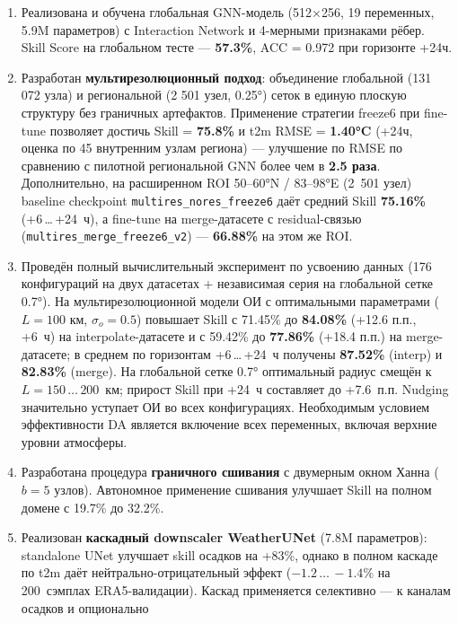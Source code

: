 \documentclass[14pt,a4paper]{extarticle}
\numberwithin{table}{section}
\numberwithin{figure}{section}
\numberwithin{equation}{section}
\begin{document}
\begin{enumerate}
\def\labelenumi{\arabic{enumi}.}
\item
  Реализована и обучена глобальная GNN-модель (512×256, 19 переменных,
  5.9M параметров) с Interaction Network и 4-мерными признаками рёбер.
  Skill Score на глобальном тесте --- \textbf{57.3\%}, ACC = 0.972 при
  горизонте +24ч.
\item
  Разработан \textbf{мультирезолюционный подход}: объединение глобальной
  (131 072 узла) и региональной (2 501 узел, 0.25°) сеток в единую
  плоскую структуру без граничных артефактов. Применение стратегии
  freeze6 при fine-tune позволяет достичь Skill = \textbf{75.8\%} и t2m
  RMSE = \textbf{1.40°C} (+24ч, оценка по 45 внутренним узлам региона)
  --- улучшение по RMSE по сравнению с пилотной региональной GNN более
  чем в \textbf{2.5 раза}. Дополнительно, на расширенном ROI 50--60°N /
  83--98°E (2~501 узел) baseline checkpoint \texttt{multires\_nores\_freeze6}
  даёт средний Skill \textbf{75.16\%} (+6\,\dots\,+24~ч), а fine-tune
  на merge-датасете с residual-связью
  (\texttt{multires\_merge\_freeze6\_v2}) ---
  \textbf{66.88\%} на этом же ROI.
\item
  Проведён полный вычислительный эксперимент по усвоению данных (176
  конфигураций на двух датасетах + независимая серия на глобальной
  сетке 0.7°). На мультирезолюционной модели ОИ с оптимальными
  параметрами (\(L = 100\) км, \(\sigma_o = 0.5\)) повышает Skill с 71.45\% до
  \textbf{84.08\%} (+12.6 п.п., +6~ч) на interpolate-датасете и с 59.42\%
  до \textbf{77.86\%} (+18.4 п.п.) на merge-датасете; в среднем по
  горизонтам +6\,\dots\,+24~ч получены \textbf{87.52\%} (interp) и
  \textbf{82.83\%} (merge). На глобальной сетке 0.7° оптимальный радиус
  смещён к \(L = 150\,\dots\,200\)~км; прирост Skill при +24~ч составляет
  до +7.6~п.п. Nudging значительно уступает ОИ во всех конфигурациях.
  Необходимым условием эффективности DA является включение всех
  переменных, включая верхние уровни атмосферы.
\item
  Разработана процедура \textbf{граничного сшивания} с двумерным окном
  Ханна (\(b=5\) узлов). Автономное применение сшивания улучшает Skill
  на полном домене с 19.7\% до 32.2\%.
\item
  Реализован \textbf{каскадный downscaler WeatherUNet} (7.8M
  параметров): standalone UNet улучшает skill осадков на +83\%, однако в
  полном каскаде по t2m даёт нейтрально-отрицательный эффект
  (\(-1.2\,\dots\,-1.4\)\% на 200~сэмплах ERA5-валидации).
  Каскад применяется селективно --- к каналам осадков и опционально

\end{enumerate}
\end{document}
